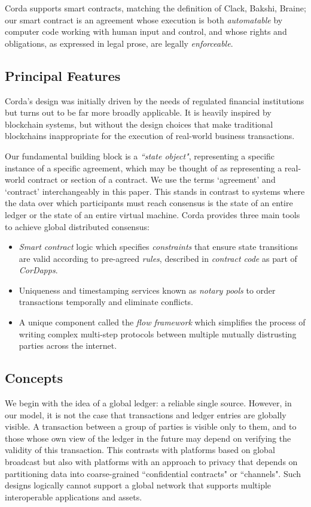 \documentclass{article}
\begin{document}
Corda supports smart contracts, matching the definition of Clack, Bakshi, Braine\cite{SCT}; our smart contract is an agreement whose execution is both \textit{automatable} by computer code working with human input and control, and whose rights and obligations, as expressed in legal prose, are legally \textit{enforceable}.

\subsection{Principal Features}
Corda's design was initially driven by the needs of regulated financial institutions but turns out to be far more broadly applicable. It is heavily inspired by blockchain systems, but without the design choices that make traditional blockchains inappropriate for the execution of real-world business transactions.

Our fundamental building block is a \textit{``state object"}, representing a specific instance of a specific agreement, which may be thought of as representing a real-world contract or section of a contract. We use the terms `agreement' and `contract' interchangeably in this paper. This stands in contrast to systems where the data over which participants must reach consensus is the state of an entire ledger or the state of an entire virtual machine. Corda provides three main tools to achieve global distributed consensus:
\begin{itemize}
    \item \textit{Smart contract} logic which specifies \textit{constraints} that ensure state transitions are valid according to pre-agreed \textit{rules}, described in \textit{contract code} as part of \textit{CorDapps}.
    \item Uniqueness and timestamping services known as \textit{notary pools} to order transactions temporally and eliminate conflicts.
    \item A unique component called the \textit{flow framework} which simplifies the process of writing complex multi-step protocols between multiple mutually distrusting parties across the internet.
\end{itemize}

\subsection{Concepts}
We begin with the idea of a global ledger: a reliable single source. However, in our model, it is not the case that transactions and ledger entries are globally visible. A transaction between a group of parties is visible only to them, and to those whose own view of the ledger in the future may depend on verifying the validity of this transaction. This contrasts with platforms based on global broadcast but also with platforms with an approach to privacy that depends on partitioning data into coarse-grained ``confidential contracts" or ``channels". Such designs logically cannot support a global network that supports multiple interoperable applications and assets.
\end{document}
